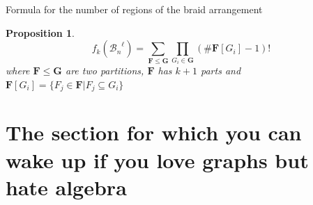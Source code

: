 \documentclass[slidetop,11pt %
]{beamer}
\newtheorem{prop}[theorem]{Proposition}
\theoremstyle{definition}
\begin{document}
\begin{frame}{Formula for the number of regions of the braid arrangement}

\begin{prop}
\begin{equation*}
f_{k}({\mathcal{B}_n}^\ell)=\sum_{\mathbf{F} \leq \mathbf{G}} \prod_{ G_i\in \mathbf{G}} \left( \# \mathbf{F}[G_i]-1\right)!
\end{equation*}
where $\mathbf{F} \leq \mathbf{G}$ are two partitions, $\mathbf{F}$ has $k+1$ parts and $\mathbf{F}[G_i]=\{F_j \in \mathbf{F} | F_j \subseteq G_i\}$
\end{prop}


\end{frame}



\section{The section for which you can wake up if you love graphs but hate algebra}\label{sect3}
\end{document}
